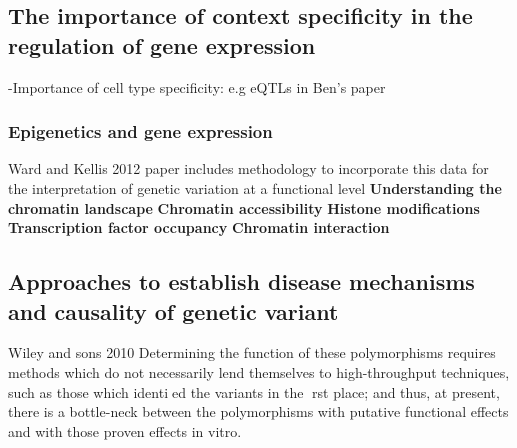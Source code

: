\subsection{The importance of context specificity in the regulation of gene expression}
-Importance of cell type specificity: e.g eQTLs in Ben's paper
\subsubsection*{Epigenetics and gene expression}
Ward and Kellis 2012 paper includes methodology to incorporate this data for the interpretation of genetic variation at a functional level
\textbf{Understanding the chromatin landscape}
\textbf{Chromatin accessibility}
\textbf{Histone modifications}
\textbf{Transcription factor occupancy}
\textbf{Chromatin interaction}


\subsection{Approaches to establish disease mechanisms and causality of genetic variant}
Wiley and sons 2010
Determining the function of these polymorphisms requires methods which do not   necessarily   lend   themselves   to   high-throughput techniques, such as those which identied the variants in the rst place; and thus, at present, there is a bottle-neck between the polymorphisms with putative functional effects and with those proven effects in vitro.



